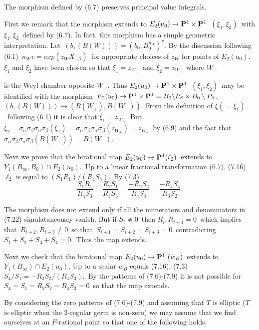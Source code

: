   The morphism defined by (6.7) preserves principal
value integrals.
\endproclaim

  First we remark that the morphism extends to
$E_2(u_0) \to {\bold P}^1\times {\bold P}^1$\ $(\xi_1,\xi_2)$\  with $\xi_1,\xi_2$\
defined by (6.7).  In fact, this morphism has a simple geometric interpretation.
Let\ $(b, (B(W))) =  (b_0, B_0^{n_W})^v$.  By the discussion following (6.1)\
$n_Wv = exp(z_WX_{-\beta})$\ for appropriate choices of $z_W$ for points of $E_2(u_0)$.
$\xi_1$ and $\xi_2$ have been chosen so that $\xi_1 = z_{W_+}$\ and $\xi_2 = 
z_{W_-}$\ where $W_-$  

\pagebreak
is the Weyl chamber opposite $W_+$.  Thus  $E_2(u_0)\to
{\bold P}^1\times {\bold P}^1$\ $(\xi_1,\xi_2)$\ may be identified with the
morphism\ $E_2(u_0)\to {\bold P}^1\times {\bold P}^1 = B_0\backslash P_\beta \times
B_0\setminus P_\beta$,\ $(b,(B(W))) \mapsto (B(W_+), B(W_{-}))$. From the definition
of $\xi (=\xi_1)$\ following (6.1) it is clear that $\xi_1 = z_{W_+}$.  But\
$\xi_2 = \sigma_\alpha\sigma_\beta\sigma_\alpha\sigma_\beta(\xi_1) = 
\sigma_\alpha\sigma_\beta\sigma_\alpha\sigma_\beta(z_{W_+}) = z_{W_-}$\ by (6.9)
and the fact that\ $\sigma_\alpha\sigma_\beta\sigma_\alpha\sigma_\beta(B(W_+)) =
B(W_-)$.

Next we prove that the birational map $E_2(u_0) \to {\bold P}^1(\ell_2)$\ extends to\
$Y_1(B_\infty, B_0) \cap E_2(u_0)$.\  Up to a linear fractional transformation (6.7),
(7.16)\ $\ell_2$  is equal to $(S_1R_1)/(R_4S_3)$.\  By (7.3)
$$
{\frac{S_1R_1}{R_4S_3}} = {\frac{R_2S_1}{R_3S_3}} = {\frac{-R_2S_2}{R_4S_4}} =
{\frac{-R_4S_4}{R_3S_2}}.
$$

\noindent The morphism does not extend only if all the numerators and denominators
in (7.22) simulataneously vanish.  But if  $S_i\ne 0$\ then $R_i,R_{i+1} = 0$\
which implies that\ $R_{i+2},R_{i+3} \ne 0$\ so that\ $S_{i+1} = S_{i+2} =
S_{i+3} = 0$\ contradicting\ $S_1 + S_2 + S_3 + S_4 = 0$.\  
Thus the map extends.

Next we check that the birational map  $E_2(u_0)\to {\bold P}^1 \ (w_B)$\  extends to
$Y_1(B_\infty)\cap E_2(u_0)$.  Up to a scalar $w_B$ equals (7.16), (7.3)
$S_4/S_1 = -R_2S_2/(R_4S_3)$.\ By the patterns of
(7.6)-(7.9) it is not possible for\ $S_4 = S_1 = R_2S_2 = R_4S_3 = 0$\ so that
the map extends.

By considering the zero patterns of (7.6)-(7.9) and assuming that  $T$  is elliptic
($T$ is elliptic when the 2-regular germ is non-zero) we may assume that we find
ourselves at an $F$-rational point so that one of the following holds:

